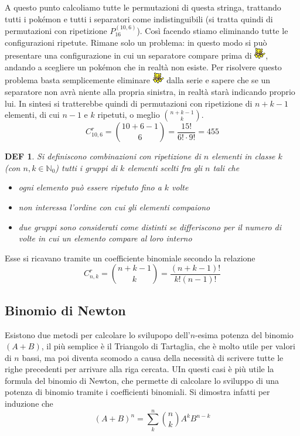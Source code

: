 \documentclass{article}     %
\newtheorem*{definition}{DEF}
\begin{document}
            A questo punto calcoliamo tutte le permutazioni di questa stringa, trattando tutti i pokémon e tutti i separatori come indistinguibili (si tratta quindi di permutazioni con ripetizione $P_{16}^{(10,6)}$). Così facendo stiamo eliminando tutte le configurazioni ripetute. Rimane solo un problema: in questo modo si può presentare una configurazione in cui un separatore compare prima di \includegraphics{pkmn/A.png}, andando a scegliere un pokémon che in realtà non esiste. Per risolvere questo problema basta semplicemente eliminare \includegraphics{pkmn/A.png} dalla serie e sapere che se un separatore non avrà niente alla propria sinistra, in realtà starà indicando proprio lui. In sintesi si tratterebbe quindi di permutazioni con ripetizione di $n+k-1$ elementi, di cui $n-1$ e $k$ ripetuti, o meglio $\binom{n+k-1}{k}$.
            \[C^r_{10,6}=\binom{10+6-1}{6}=\frac{15!}{6!\cdot9!}=455\]
            \begin{definition}  
                Si definiscono combinazioni con ripetizione di $n$ elementi in classe $k$ (con $n,k\in \mathbb{N}_0$) tutti i gruppi di $k$ elementi scelti fra gli $n$ tali che 
                \begin{itemize}
                    \item ogni elemento può essere ripetuto fino a $k$ volte
                    \item non interessa l'ordine con cui gli elementi compaiono
                    \item due gruppi sono considerati come distinti se differiscono per il numero di volte in cui un elemento compare al loro interno
                \end{itemize}
            \end{definition}
            Esse si ricavano tramite un coefficiente binomiale secondo la relazione \[C_{n,k}^r=\binom{n+k-1}{k}=\frac{(n+k-1)!}{k!(n-1)!}\]

        \subsection{Binomio di Newton}
            Esistono due metodi per calcolare lo svilupopo dell'$n$-esima potenza del binomio $(A+B)$, il più semplice è il Triangolo di Tartaglia, che è molto utile per valori di $n$ bassi, ma poi diventa scomodo a causa della necessità di scrivere tutte le righe precedenti per arrivare alla riga cercata. UIn questi casi è più utile la formula del binomio di Newton, che permette di calcolare lo sviluppo di una potenza di binomio tramite i coefficienti binomiali. Si dimostra infatti per induzione che 
            \[(A+B)^n=\sum_k^n\binom{n}{k}A^kB^{n-k}\]
\end{document}
